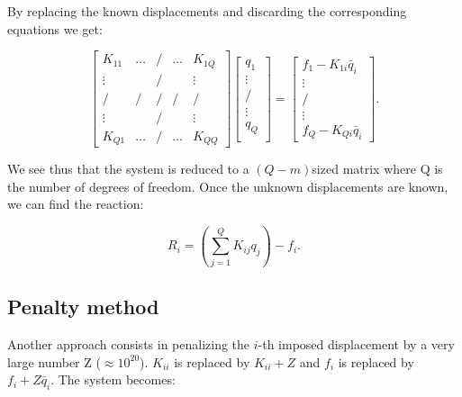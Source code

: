 	By replacing the known displacements and discarding the corresponding equations we get:
	
	\begin{equation}
	\left[
	\begin{array}{ccccc}
	K_{11} & \dots & / & \dots & K_{1Q}\\
	\vdots & & / & & \vdots\\
	/ & / & / & / & / \\
	\vdots & & / & & \vdots\\
	K_{Q1}& \dots & / & \dots & K_{QQ}
	\end{array}
	\right]
	\left[
	\begin{array}{c}
	q_{1}\\
	\vdots\\
	/\\
	\vdots\\
	q_Q\\
	\end{array}
	\right]
	=
	\left[
	\begin{array}{c}
	f_{1}-K_{1i}\bar{q}_i\\
	\vdots\\
	/\\
	\vdots\\
	f_Q-K_{Qi}\bar{q}_i
	\end{array}
	\right].
	\end{equation}
	
	We see thus that the system is reduced to a $(Q-m)$sized matrix where Q is the number of degrees of freedom. Once the unknown displacements are known, we can find the reaction: 
	
	\begin{equation}
	R_i =\left( \sum _{j=1}^Q K_{ij}q_j \right) - f_i.
	\end{equation}
	
\subsection{Penalty method}
	Another approach consists in penalizing the $i$-th imposed displacement by a very large number Z ($\approx 10^{20}$). $K_{ii}$ is replaced by $K_{ii} + Z$ and $f_i$ is replaced by $f_i+Z\bar{q}_i$. The system becomes: 
	
